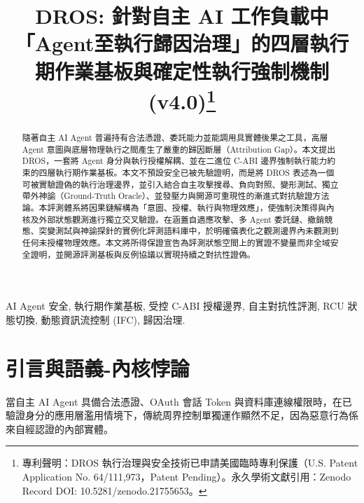\documentclass[conference]{IEEEtran}
\begin{document}
\title{DROS: 針對自主 AI 工作負載中「Agent至執行歸因治理」的四層執行期作業基板與確定性執行強制機制 (v4.0)\thanks{專利聲明：DROS 執行治理與安全技術已申請美國臨時專利保護（U.S. Patent Application No. 64/111,973，Patent Pending）。永久學術文獻引用：Zenodo Record DOI: 10.5281/zenodo.21755653。}}

\author{
}

\maketitle
\thispagestyle{plain}
\pagestyle{plain}

\begin{abstract}
隨著自主 AI Agent 普遍持有合法憑證、委託能力並能調用具實體後果之工具，高層 Agent 意圖與底層物理執行之間產生了嚴重的歸因斷層（Attribution Gap）。本文提出 DROS，一套將 Agent 身分與執行授權解耦、並在二進位 C-ABI 邊界強制執行能力約束的四層執行期作業基板。本文不預設安全已被先驗證明，而是將 DROS 表述為一個可被實驗證偽的執行治理邊界，並引入結合自主攻擊搜尋、負向對照、變形測試、獨立帶外神諭（Ground-Truth Oracle）、並發壓力與開源可重現性的漸進式對抗驗證方法論。本評測體系將因果鏈解構為「意圖、授權、執行與物理效應」，使強制決策得與內核及外部狀態觀測進行獨立交叉驗證。在涵蓋自適應攻擊、多 Agent 委託鏈、撤銷競態、突變測試與神諭探針的實例化評測語料庫中，於明確儀表化之觀測邊界內未觀測到任何未授權物理效應。本文將所得保證宣告為評測狀態空間上的實證不變量而非全域安全證明，並開源評測基板與反例協議以實現持續之對抗性證偽。
\end{abstract}

\begin{IEEEkeywords}
AI Agent 安全, 執行期作業基板, 受控 C-ABI 授權邊界, 自主對抗性評測, RCU 狀態切換, 動態資訊流控制 (IFC), 歸因治理.
\end{IEEEkeywords}

\section{引言與語義-內核悖論}
當自主 AI Agent 具備合法憑證、OAuth 會話 Token 與資料庫連線權限時，在已驗證身分的應用層濫用情境下，傳統周界控制單獨運作顯然不足，因為惡意行為係來自經認證的內部實體。
\end{document}
